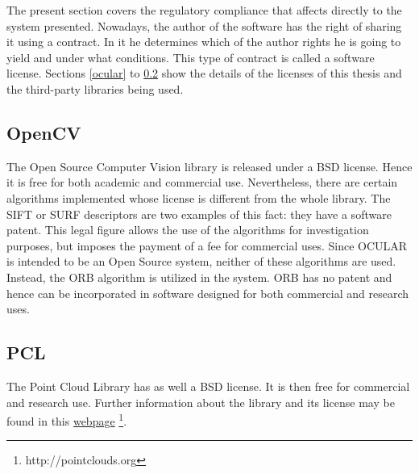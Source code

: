 	The present section covers the regulatory compliance that affects directly to the system presented. 
	Nowadays, the author of the software has the right of sharing it using a contract. 
	In it he determines which of the author rights he is going to yield and under what conditions. 
	This type of contract is called a software license. 
	Sections \ref{ocular} to \ref{pcl} show the details of the licenses of this thesis and the third-party libraries being used. 

	\subsection{OpenCV}
	The Open Source Computer Vision library is released under a BSD license. 
	Hence it is free for both academic and commercial use. 
	Nevertheless, there are certain algorithms implemented whose license is different from the whole library. 
	The SIFT or SURF descriptors are two examples of this fact: they have a software patent. 
	This legal figure allows the use of the algorithms for investigation purposes, but imposes the payment of a fee for commercial uses. 
	Since OCULAR is intended to be an Open Source system, neither of these algorithms are used.
	Instead, the ORB algorithm is utilized in the system.%
	ORB has no patent and hence can be incorporated in software designed for both commercial and research uses. 

	\subsection{PCL}
	\label{pcl}
	The Point Cloud Library has as well a BSD license. 
	It is then free for commercial and research use. 
	Further information about the library and its license may be found in this \href{http://pointclouds.org}{\color{blue} {webpage}} \footnote{http://pointclouds.org}. 


